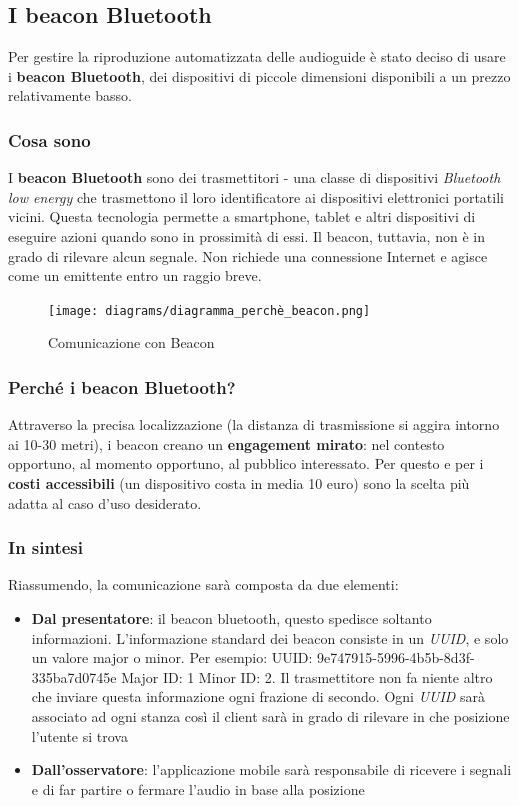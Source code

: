 \subsection{I beacon Bluetooth}
Per gestire la riproduzione automatizzata delle audioguide è stato deciso di usare i \textbf{beacon Bluetooth}, dei dispositivi di piccole dimensioni disponibili a un prezzo relativamente basso. 

\subsubsection{Cosa sono}
I \textbf{beacon Bluetooth} sono dei trasmettitori - una classe di dispositivi \emph{Bluetooth low energy} che trasmettono il loro identificatore ai dispositivi elettronici portatili vicini. Questa tecnologia permette a smartphone, tablet e altri dispositivi di eseguire azioni quando sono in prossimità di essi. Il beacon, tuttavia, non è in grado di rilevare alcun segnale. Non richiede una connessione Internet e agisce come un emittente entro un raggio breve.\cite{what_are_beacons}


\begin{center}
\begin{figure}[htp]
    \centering
    \texttt{[image: diagrams/diagramma\_perchè\_beacon.png]}
    \caption{Comunicazione con Beacon}
    \label{fig:comunicazione_beacon}
\end{figure}
\end{center}

\subsubsection{Perché i beacon Bluetooth?}
Attraverso la precisa localizzazione (la distanza di trasmissione si aggira intorno ai 10-30 metri), i beacon creano un \textbf{engagement mirato}: nel contesto opportuno, al momento opportuno, al pubblico interessato. Per questo e per i \textbf{costi accessibili} (un dispositivo costa in media 10 euro) sono la scelta più adatta al caso d'uso desiderato.

\subsubsection{In sintesi}
Riassumendo, la comunicazione sarà composta da due elementi:
\begin{itemize}
    \item \textbf{Dal presentatore}: il beacon bluetooth, questo spedisce soltanto informazioni. L’informazione standard dei beacon consiste in un \emph{UUID}, e solo un valore major o minor. Per
    esempio: UUID: 9e747915-5996-4b5b-8d3f-335ba7d0745e Major ID: 1 Minor ID: 2. Il trasmettitore non fa niente altro che inviare questa informazione ogni frazione di secondo. Ogni \emph{UUID} sarà associato ad ogni stanza così il client sarà in grado di rilevare in che posizione l'utente si trova
    \item \textbf{Dall'osservatore}: l'applicazione mobile sarà responsabile di ricevere i segnali e di far partire o fermare l'audio in base alla posizione
\end{itemize}

